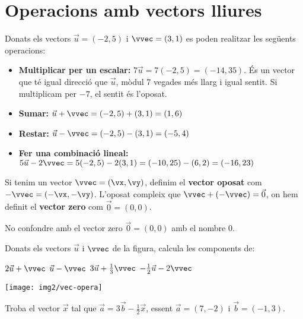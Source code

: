 \documentclass[11pt, a4paper, pdf]{article}
\begin{document}
 \section{Operacions amb vectors lliures}
 
 \begin{theorybox}
 	Donats els vectors $\vec u=(-2, 5)$ i $\vvec=(3,1)$ es poden realitzar les següents operacions:
 	
 	\begin{itemize}
 		\item \textbf{Multiplicar per un escalar:}  $7 \vec u = 7 (-2, 5) = (-14, 35)$. És un vector que té igual direcció que $\vec u$, mòdul 7 vegades més llarg i igual sentit. Si multiplicam per $-7$, el sentit és l'oposat.
 		
 		\item \textbf{Sumar:} $\vec u + \vvec=(-2, 5)  + (3,1) = (1, 6)$
 		
 		\item \textbf{Restar:} $\vec u - \vvec=(-2, 5)  - (3,1) = (-5, 4)$
 		
 		\item \textbf{Fer una combinació lineal:} $5 \vec u - 2\vvec =5(-2, 5)  - 2(3,1) = (-10, 25)-(6,2)=(-16, 23)$
 	\end{itemize}
 	
 	Si tenim un vector $\vvec=(\vx,\vy)$, definim el \textbf{vector oposat} com $-\vvec=(-\vx, -\vy)$. L'oposat compleix que $\vvec+(-\vvec)=\vec 0$,
 	on hem definit el \textbf{vector zero} com $\vec 0=(0, 0)$.
 	
 		No confondre amb el vector zero  $\vec 0=(0, 0)$ amb el nombre $0$.
 \end{theorybox} 

 
\begin{mylist}
	
	\item Donats els vectors $\vec u$ i $\vvec$ de la figura, calcula les components de: 
	
	 \begin{minipage}{0.6\textwidth}
	 \begin{tasks}
		\task $2\vec u + \vvec$	
		\task $\vec u - \vvec$
		\task $3\vec u + \frac{1}{3} \vvec$
		\task $-\frac{1}{2} \vec u -2 \vvec$
	\end{tasks}
\end{minipage}
\begin{minipage}{0.4\textwidth}
		\begin{center}
			\vspace{-1cm}
			\texttt{[image: img2/vec-opera]}
		\end{center}
\end{minipage}
 
	\item Troba el vector $\vec x$ tal que $\vec a = 3 \vec b -\frac{1}{2} \vec x$, essent $\vec a=(7,-2)$ i $\vec b =(-1,3)$.
	
\end{mylist}
\end{document}
